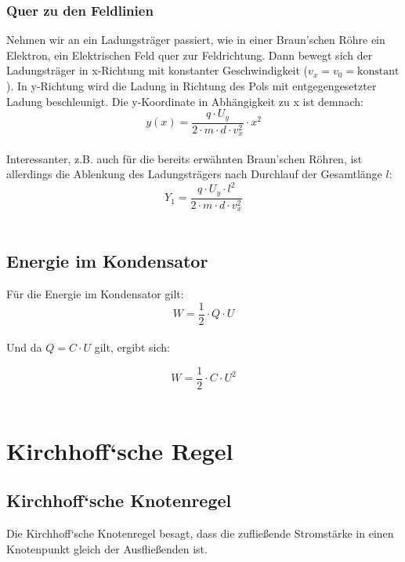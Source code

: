 \documentclass[a4paper]{article}
\begin{document}
\subsubsection{Quer zu den Feldlinien}

Nehmen wir an ein Ladungsträger passiert, wie in einer Braun'schen Röhre ein Elektron, ein Elektrischen Feld
quer zur Feldrichtung. Dann bewegt sich der Ladungsträger in x-Richtung mit konstanter Geschwindigkeit
($v_x = v_0 = \text{konstant}$). In y-Richtung wird die Ladung in Richtung des Pols mit entgegengesetzter Ladung
beschleunigt. Die y-Koordinate in Abhängigkeit zu x ist demnach:\\ $$y(x) = \dfrac{q \cdot U_y}{2 \cdot m \cdot d \cdot v_x ^2} \cdot x^2$$\\

Interessanter, z.B. auch für die bereits erwähnten Braun'schen Röhren, ist allerdings die Ablenkung des Ladungsträgers
nach Durchlauf der Gesamtlänge $l$:\\

\Large$$Y_1 = \dfrac{q \cdot U_y \cdot l^2}{2 \cdot m \cdot d \cdot v_x ^2}$$\\ \normalsize



\newpage
\subsection{Energie im Kondensator}

Für die Energie im Kondensator gilt:\\

$$W = \frac{1}{2} \cdot Q \cdot U$$\\

Und da $Q = C \cdot U$ gilt, ergibt sich:

\Large$$W = \frac{1}{2} \cdot C \cdot U^2$$\\ \normalsize





\section{Kirchhoff‘sche Regel}
\subsection{Kirchhoff‘sche Knotenregel}
Die Kirchhoff‘sche Knotenregel besagt, dass die zufließende Stromstärke in einen Knotenpunkt gleich der
Ausfließenden ist.
\end{document}
